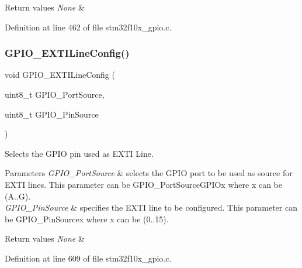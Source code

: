 \begin{DoxyRetVals}{Return values}
{\em None} & \\
\hline
\end{DoxyRetVals}


Definition at line 462 of file stm32f10x\+\_\+gpio.\+c.

\mbox{\label{group___g_p_i_o___exported___functions_ga8c1f13646d7418827378032a584da653}} 
\subsubsection{\texorpdfstring{G\+P\+I\+O\+\_\+\+E\+X\+T\+I\+Line\+Config()}{GPIO\_EXTILineConfig()}}
{\footnotesize\ttfamily void G\+P\+I\+O\+\_\+\+E\+X\+T\+I\+Line\+Config (\begin{DoxyParamCaption}\item[{uint8\+\_\+t}]{G\+P\+I\+O\+\_\+\+Port\+Source,  }\item[{uint8\+\_\+t}]{G\+P\+I\+O\+\_\+\+Pin\+Source }\end{DoxyParamCaption})}



Selects the G\+P\+IO pin used as E\+X\+TI Line. 


\begin{DoxyParams}{Parameters}
{\em G\+P\+I\+O\+\_\+\+Port\+Source} & selects the G\+P\+IO port to be used as source for E\+X\+TI lines. This parameter can be G\+P\+I\+O\+\_\+\+Port\+Source\+G\+P\+I\+Ox where x can be (A..G). \\
\hline
{\em G\+P\+I\+O\+\_\+\+Pin\+Source} & specifies the E\+X\+TI line to be configured. This parameter can be G\+P\+I\+O\+\_\+\+Pin\+Sourcex where x can be (0..15). \\
\hline
\end{DoxyParams}

\begin{DoxyRetVals}{Return values}
{\em None} & \\
\hline
\end{DoxyRetVals}


Definition at line 609 of file stm32f10x\+\_\+gpio.\+c.

